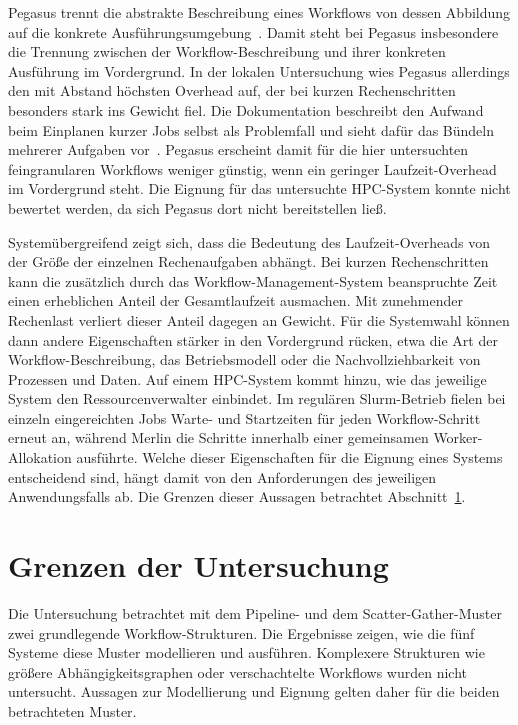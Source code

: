 Pegasus trennt die abstrakte Beschreibung eines Workflows von
dessen Abbildung auf die konkrete
Ausführungsumgebung~\cite[S.~18--20]{deelman2015pegasus}. Damit
steht bei Pegasus insbesondere die Trennung zwischen der
Workflow-Beschreibung und ihrer konkreten Ausführung im
Vordergrund. In der lokalen Untersuchung wies Pegasus allerdings
den mit Abstand höchsten Overhead auf, der bei kurzen
Rechenschritten besonders stark ins Gewicht fiel. Die
Dokumentation beschreibt den Aufwand beim Einplanen kurzer Jobs
selbst als Problemfall und sieht dafür das Bündeln mehrerer
Aufgaben vor~\cite{pegasusdocs-optimizing}. Pegasus erscheint
damit für die hier untersuchten feingranularen Workflows weniger
günstig, wenn ein geringer Laufzeit-Overhead im Vordergrund steht.
Die Eignung für das untersuchte HPC-System konnte nicht bewertet
werden, da sich Pegasus dort nicht bereitstellen ließ.

Systemübergreifend zeigt sich, dass die Bedeutung des
Laufzeit-Overheads von der Größe der einzelnen Rechenaufgaben
abhängt. Bei kurzen Rechenschritten kann die zusätzlich durch das
Workflow-Management-System beanspruchte Zeit einen erheblichen
Anteil der Gesamtlaufzeit ausmachen. Mit zunehmender Rechenlast
verliert dieser Anteil dagegen an Gewicht. Für die Systemwahl
können dann andere Eigenschaften stärker in den Vordergrund
rücken, etwa die Art der Workflow-Beschreibung, das Betriebsmodell
oder die Nachvollziehbarkeit von Prozessen und Daten.
Auf einem HPC-System kommt hinzu, wie das jeweilige System den
Ressourcenverwalter einbindet. Im regulären Slurm-Betrieb fielen
bei einzeln eingereichten Jobs Warte- und Startzeiten für jeden
Workflow-Schritt erneut an, während Merlin die Schritte innerhalb
einer gemeinsamen Worker-Allokation ausführte. Welche dieser
Eigenschaften für die Eignung eines Systems entscheidend sind,
hängt damit von den Anforderungen des jeweiligen Anwendungsfalls
ab. Die Grenzen dieser Aussagen betrachtet
Abschnitt~\ref{sec:diskussion:grenzen}.

\section{Grenzen der Untersuchung}
\label{sec:diskussion:grenzen}

Die Untersuchung betrachtet mit dem Pipeline- und dem
Scatter-Gather-Muster zwei grundlegende Workflow-Strukturen. Die
Ergebnisse zeigen, wie die fünf Systeme diese Muster modellieren
und ausführen. Komplexere Strukturen wie größere
Abhängigkeitsgraphen oder verschachtelte Workflows wurden nicht untersucht. Aussagen zur Modellierung und Eignung gelten daher für die beiden betrachteten
Muster.

